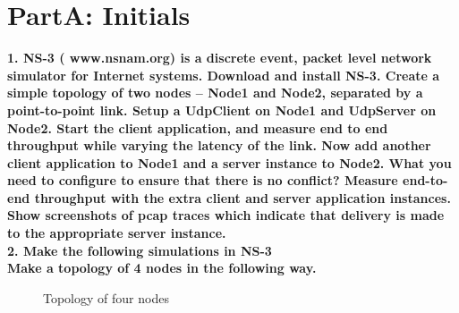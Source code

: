 \documentclass[11pt]{article}
\numberwithin{equation}{section}
\begin{document}



\renewcommand\contentsname{{\Huge Contents}\vspace{0.5cm}}
\cleardoublepage
{}
{}
\setcounter{tocdepth}{8}


\cleardoublepage
{}
\renewcommand\listfigurename{{\Huge List of Figures}\vspace{0.5cm}}

\pagebreak

\section*{PartA: Initials}

\textbf{1. NS-3 ( www.nsnam.org) is a discrete event, packet level network simulator for Internet systems. Download and install NS-3. Create a simple topology of two nodes – Node1 and Node2, separated by a point-to-point link. Setup a UdpClient on Node1 and UdpServer on Node2. Start the client application, and measure end to end throughput while varying the latency of the link. Now add another client application to Node1 and a server instance to Node2. What you need to configure to ensure that there is no conflict? Measure end-to-end throughput with the extra client and server application instances. Show screenshots of pcap traces which indicate that delivery is made to the appropriate server instance. }\\

\textbf{ 2. Make the following simulations in NS-3}\\

\textbf{Make a topology of 4 nodes in the following way.}\\

\begin{figure}[H]
\begin{center}
		\centering
		\caption{Topology of four nodes}
		\label{fig:q1_f1_a}
\end{center}
\end{figure}
\end{document}
